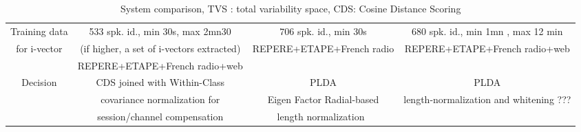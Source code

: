 \begin{table*}[t]
\begin{tabular}{|c|c|c|c|}
    \hline    
    Training data   & 533 spk. id., min 30s, max 2mn30                  & $706$ spk. id., min 30s                  &  680 spk. id., min 1mn , max 12 min         \\
    for i-vector    & (if higher, a set of i-vectors extracted)              & REPERE+ETAPE+French radio                       &  REPERE+ETAPE+French radio+web         \\
                    & REPERE+ETAPE+French radio+web                                 &                &           \\            
    \hline    
    Decision        & CDS joined with Within-Class                  & PLDA                                            &  PLDA         \\
                    & covariance normalization for                  &   Eigen Factor Radial-based                                               &  length-normalization and whitening ???        \\
                    & session/channel compensation                  &    length normalization~\cite{bousquet2011}                            &           \\
    \hline                              
  \end{tabular}
  \caption{System comparison, TVS : total variability space, CDS: Cosine Distance Scoring}
  \label{tab:system}  
\end{table*}

